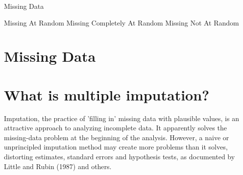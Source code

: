 Missing Data

Missing At Random
Missing Completely At Random
Missing Not At Random

\section{Missing Data}

\section{What is multiple imputation?}

Imputation, the practice of 'filling in' missing data with plausible values, is an attractive approach to analyzing incomplete data. It apparently solves the missing-data problem at the beginning of the analysis. However, a naive or unprincipled imputation method may create more problems than it solves, distorting estimates, standard errors and hypothesis tests, as documented by Little and Rubin (1987) and others.

